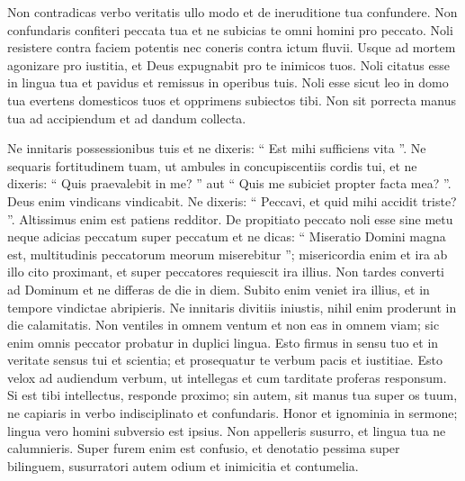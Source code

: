 \begin{biblechapter}
\begin{biblechapter}
\begin{biblechapter}
\begin{biblechapter}
 \verse Non contradicas verbo veritatis ullo modo
 et de ineruditione tua confundere.
 \verse Non confundaris confiteri peccata tua
 et ne subicias te omni homini pro peccato.
 \verse Noli resistere contra faciem potentis
 nec coneris contra ictum fluvii.
 \verse Usque ad mortem agonizare pro iustitia,
 et Deus expugnabit pro te inimicos tuos.
 \verse Noli citatus esse in lingua tua
 et pavidus et remissus in operibus tuis.
 \verse Noli esse sicut leo in domo tua
 evertens domesticos tuos et opprimens subiectos tibi.
 \verse Non sit porrecta manus tua ad accipiendum
 et ad dandum collecta.
 
\begin{biblechapter}
\verse Ne innitaris possessionibus tuis
 et ne dixeris: “ Est mihi sufficiens vita ”.
 \verse Ne sequaris fortitudinem tuam,
 ut ambules in concupiscentiis cordis tui,
 \verse et ne dixeris: “ Quis praevalebit in me? ”
 aut “ Quis me subiciet propter facta mea? ”.
 Deus enim vindicans vindicabit.
 \verse Ne dixeris: “ Peccavi, et quid mihi accidit triste? ”.
 Altissimus enim est patiens redditor.
 \verse De propitiato peccato noli esse sine metu
 neque adicias peccatum super peccatum
 \verse et ne dicas: “ Miseratio Domini magna est,
 multitudinis peccatorum meorum miserebitur ”;
 \verse misericordia enim et ira ab illo cito proximant,
 et super peccatores requiescit ira illius.
 \verse Non tardes converti ad Dominum
 et ne differas de die in diem.
 \verse Subito enim veniet ira illius,
 et in tempore vindictae abripieris.
 \verse Ne innitaris divitiis iniustis,
 nihil enim proderunt in die calamitatis.
 \verse Non ventiles in omnem ventum
 et non eas in omnem viam;
 sic enim omnis peccator probatur in duplici lingua.
 \verse Esto firmus in sensu tuo
 et in veritate sensus tui et scientia;
 et prosequatur te verbum pacis et iustitiae.
 \verse Esto velox ad audiendum verbum, ut intellegas
 et cum tarditate proferas responsum.
 \verse Si est tibi intellectus, responde proximo;
 sin autem, sit manus tua super os tuum,
 ne capiaris in verbo indisciplinato et confundaris.
 \verse Honor et ignominia in sermone;
 lingua vero homini subversio est ipsius.
 \verse Non appelleris susurro,
 et lingua tua ne calumnieris.
 \verse Super furem enim est confusio,
 et denotatio pessima super bilinguem,
 susurratori autem odium et inimicitia et contumelia.
 

\end{biblechapter}
\end{biblechapter}
\end{biblechapter}
\end{biblechapter}
\end{biblechapter}
